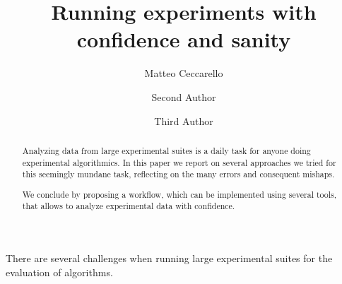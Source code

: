 \documentclass{llncs}
\begin{document}
\title{Running experiments with confidence and sanity}
%
%
\author{Matteo Ceccarello \and
Second Author \and
Third Author}
%
%
%
\maketitle              %
%
\begin{abstract}
Analyzing data from large experimental suites is a daily task for
anyone doing experimental algorithmics.
In this paper we report on several approaches we tried for this 
seemingly mundane task, reflecting on the many errors and consequent
mishaps.

We conclude by proposing a workflow, which can be implemented using several
tools, that allows to analyze experimental data with confidence.

\end{abstract}

There are several challenges when running large experimental suites
for the evaluation of algorithms.
\end{document}
